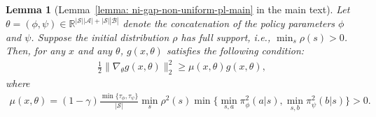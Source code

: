 \documentclass{article}
\theoremstyle{plain}
\newtheorem{lemma}{Lemma}
\theoremstyle{definition}
\theoremstyle{remark}
\def\R{\mathbb R}
\def\cA{\mathcal A}
\def\cB{\mathcal B}
\def\cS{\mathcal S}
\begin{document}
\begin{lemma}[Lemma~\ref{lemma: ni-gap-non-uniform-pl-main} in the main text]
    \label{lemma: non-uniform-pl-condition-ni-gap-appendix}
    Let $\theta = (\phi,\psi) \in \R^{|\cS||\cA| + |\cS||\cB|}$ denote the
concatenation of the policy parameters $\phi$ and $\psi$. Suppose the initial
distribution $\rho$ has full support, i.e., $\min_s \rho(s)>0$. Then, for any
$x$ and any $\theta$, $g(x,\theta)$ satisfies the following condition:
    \begin{align}
        \frac{1}{2}\| \nabla_{\theta} g(x,\theta) \|_2^2 \geq \mu(x,\theta) g(x,\theta), 
    \end{align}
    where 
    \begin{align*}
        \mu(x,\theta) = (1-\gamma)\frac{\min \{\tau_\phi,\tau_\psi\}}{|\cS|} \min_s \rho^2(s) \min\{ \min_{s,a}\pi^2_\phi(a|s), \min_{s,b} \pi^2_\psi(b|s) \} > 0.
    \end{align*}
\end{lemma}
\end{document}
